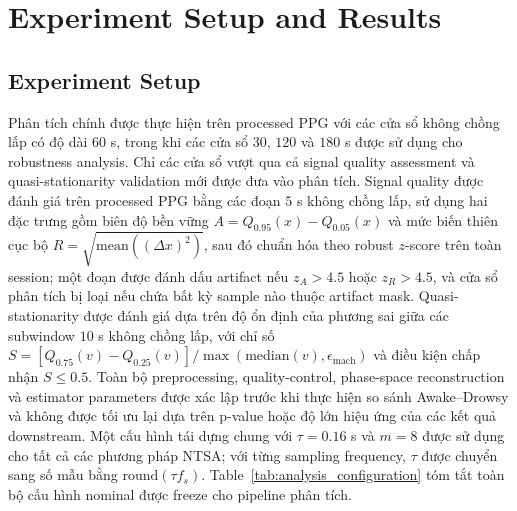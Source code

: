 \section{Experiment Setup and Results}

\subsection{Experiment Setup}

Phân tích chính được thực hiện trên processed PPG với các cửa sổ không chồng lấp có độ dài $60$ s, trong khi các cửa sổ $30$, $120$ và $180$ s được sử dụng cho robustness analysis. Chỉ các cửa sổ vượt qua cả signal quality assessment và quasi-stationarity validation mới được đưa vào phân tích. Signal quality được đánh giá trên processed PPG bằng các đoạn $5$ s không chồng lấp, sử dụng hai đặc trưng gồm biên độ bền vững $A=Q_{0.95}(x)-Q_{0.05}(x)$ và mức biến thiên cục bộ $R=\sqrt{\mathrm{mean}((\Delta x)^2)}$, sau đó chuẩn hóa theo robust $z$-score trên toàn session; một đoạn được đánh dấu artifact nếu $z_A>4.5$ hoặc $z_R>4.5$, và cửa sổ phân tích bị loại nếu chứa bất kỳ sample nào thuộc artifact mask. Quasi-stationarity được đánh giá dựa trên độ ổn định của phương sai giữa các subwindow $10$ s không chồng lấp, với chỉ số $S=[Q_{0.75}(v)-Q_{0.25}(v)]/\max(\mathrm{median}(v),\epsilon_{\mathrm{mach}})$ và điều kiện chấp nhận $S\leq0.5$. Toàn bộ preprocessing, quality-control, phase-space reconstruction và estimator parameters được xác lập trước khi thực hiện so sánh Awake--Drowsy và không được tối ưu lại dựa trên p-value hoặc độ lớn hiệu ứng của các kết quả downstream. Một cấu hình tái dựng chung với $\tau=0.16$ s và $m=8$ được sử dụng cho tất cả các phương pháp NTSA; với từng sampling frequency, $\tau$ được chuyển sang số mẫu bằng $\mathrm{round}(\tau f_s)$. Table~\ref{tab:analysis_configuration} tóm tắt toàn bộ cấu hình nominal được freeze cho pipeline phân tích.


